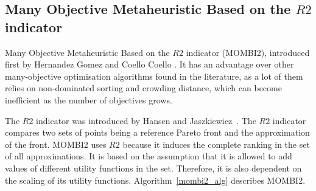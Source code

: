 
\subsection{Many Objective Metaheuristic Based on the $R2$ indicator}

Many Objective Metaheuristic Based on the $R2$ indicator (MOMBI2), introduced first by Hernandez Gomez and Coello Coello \cite{hernandez2015improved}. It has an advantage over other many-objective optimisation algorithms found in the literature, as a lot of them relies on non-dominated sorting and crowding distance, which can become inefficient as the number of objectives grows. 


The $R2$ indicator was introduced by Hansen and Jaszkiewicz~\cite{trautmann2013r2}. The $R2$ indicator compares two sets of points being a reference Pareto front and the approximation of the front. %
%
%
MOMBI2 uses $R2$ because it induces the complete ranking in the set of all approximations. It is based on the assumption that it is allowed to add values of different utility functions in the set. Therefore, it is also dependent on the scaling of its utility functions. %
%
%
Algorithm~\ref{mombi2_alg} describes MOMBI2.


